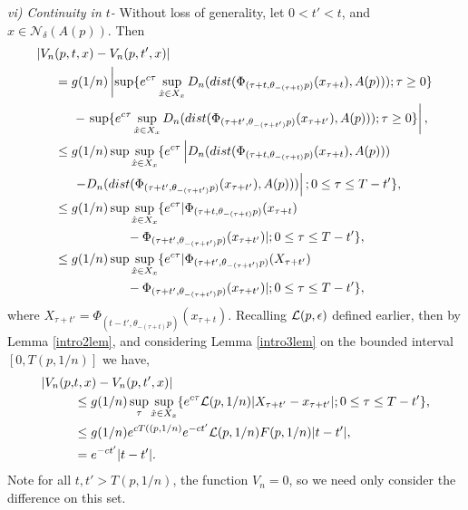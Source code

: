 \begin{prf}
  {\em vi) Continuity in $t$-} Without loss of generality, let $0 < t' < t$,
  and $x \in \mathcal{N}_{\delta}(A(p))$. Then
  \begin{align*}
  |V_n&(p, t, x) - V_n( p, t', x)| \\
    &= g(1/n) \left| \sup \{
    e^{c\tau} \sup_{\hat{x} \in X_x} D_n(dist(\Phi_{(\tau+t,
    \theta_{-(\tau+t)} p)}(x_{\tau + t}), A(p))) ; \tau \geq 0 \} \right. \\
  & \hspace{5mm} - \left. \sup \{ e^{c\tau} \sup_{\hat{x} \in X_x}
    D_n(dist(\Phi_{(\tau+t', \theta_{-(\tau+t')} p)}
    (x_{\tau + t'}), A(p))) ; \tau \geq 0 \} \right|, \\
  &\leq g(1/n) \sup \sup_{\hat{x} \in X_x} \{ e^{c\tau}
    \left |D_n(dist(\Phi_{(\tau+t, \theta_{-(\tau+t)}
    p)}(x_{\tau + t}),A(p))) \right. \\
  & \hspace{5mm} \left. - D_n(dist(\Phi_{(\tau+t', \theta_{-(\tau+t')} p)}
    (x_{\tau + t'}), A(p))) \right| ; 0 \leq \tau \leq T - t' \}, \\
  &\leq g(1/n) \sup \sup_{\hat{x} \in X_x} \{ e^{c\tau} | \Phi_{(\tau+t,
    \theta_{-(\tau + t)} p)}(x_{\tau + t}) \\
  & \hspace{2cm} - \Phi_{(\tau+t',\theta_{-(\tau+t')} p)}(x_{\tau + t'})| ; 0
    \leq \tau \leq T - t' \},  \\
  &\leq g(1/n) \sup \sup_{\hat{x} \in X_x} \{ e^{c\tau} | \Phi_{(\tau+t',
    \theta_{-(\tau+t')} p)}(X_{\tau + t'}) \\
  & \hspace{2cm} - \Phi_{(\tau+t',\theta_{-(\tau+t')}
    p)}(x_{\tau + t'}) | ; 0 \leq \tau \leq T - t' \},  \\
  \end{align*}
  where $X_{\tau + t'} = \Phi_{(t-t', \theta_{-(\tau + t)}p)}(x_{\tau + t})$.
  Recalling $\mathcal{L}(p, \epsilon)$ defined earlier, then by Lemma \ref{intro2lem},
  and considering Lemma \ref{intro3lem} on the bounded interval $[0, T(p,
  1/n)]$ we have,
\begin{align}
  |V_n(p, &t, x) - V_n( p, t', x)| \\
  & \leq g(1/n) \sup_{\tau} \sup_{\hat{x} \in X_x} \{
    e^{c\tau} \mathcal{L}(p, 1/n) |X_{\tau + t'} - x_{\tau + t'}|
    ; 0 \leq \tau \leq T - t' \}, \notag \\
  &\leq g(1/n) e^{c T((p, 1/n)} e^{-ct'} \mathcal{L}(p, 1/n) F(p, 1/n) |t - t'|,
    \notag \\
  &= e^{-ct'} |t - t'|. \notag \\
  \end{align}
  Note for all $t, t' > T(p, 1/n)$, the function $V_n =0$, so we need only
  consider the difference on this set.


\end{prf}
